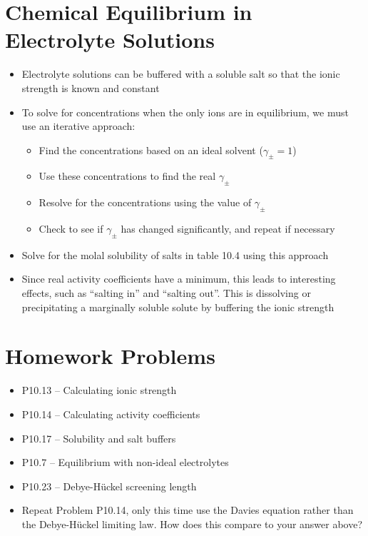 \documentclass[12pt, openany, letterpaper]{memoir}
\begin{document}
\section*{Chemical Equilibrium in Electrolyte Solutions}
\begin{itemize}
	\item Electrolyte solutions can be buffered with a soluble salt so that the ionic strength is known and constant
	\item To solve for concentrations when the only ions are in equilibrium, we must use an iterative approach:
	\begin{itemize}
		\item Find the concentrations based on an ideal solvent ($\gamma_\pm = 1$)
		\item Use these concentrations to find the real $\gamma_\pm$
		\item Resolve for the concentrations using the value of $\gamma_\pm$
		\item Check to see if $\gamma_\pm$ has changed significantly, and repeat if necessary
	\end{itemize}
	\item Solve for the molal solubility of salts in table 10.4 using this approach
	\item Since real activity coefficients have a minimum, this leads to interesting effects, such as ``salting in'' and ``salting out''. This is dissolving or precipitating a marginally soluble solute by buffering the ionic strength
\end{itemize}
\section*{Homework Problems}
\begin{itemize}
	\item P10.13 -- Calculating ionic strength
	\item P10.14 -- Calculating activity coefficients
	\item P10.17 -- Solubility and salt buffers
	\item P10.7 -- Equilibrium with non-ideal electrolytes
	\item P10.23 -- Debye-H\"uckel screening length
	\item Repeat Problem P10.14, only this time use the Davies equation rather than the Debye-H\"uckel limiting law. How does this compare to your answer above?
\end{itemize}
\end{document}
